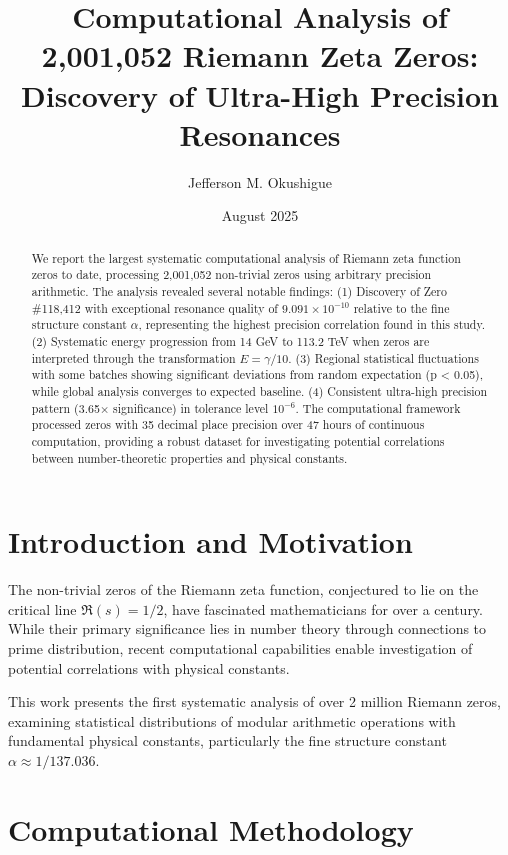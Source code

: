 \documentclass[12pt, a4paper]{article}
\title{Computational Analysis of 2,001,052 Riemann Zeta Zeros:\\ Discovery of Ultra-High Precision Resonances}
\author{Jefferson M. Okushigue}
\date{August 2025}
\begin{document}
\maketitle

\begin{abstract}
We report the largest systematic computational analysis of Riemann zeta function zeros to date, processing 2,001,052 non-trivial zeros using arbitrary precision arithmetic. The analysis revealed several notable findings: (1) Discovery of Zero \#118,412 with exceptional resonance quality of $9.091 \times 10^{-10}$ relative to the fine structure constant $\alpha$, representing the highest precision correlation found in this study. (2) Systematic energy progression from 14 GeV to 113.2 TeV when zeros are interpreted through the transformation $E = \gamma/10$. (3) Regional statistical fluctuations with some batches showing significant deviations from random expectation (p < 0.05), while global analysis converges to expected baseline. (4) Consistent ultra-high precision pattern (3.65× significance) in tolerance level $10^{-6}$. The computational framework processed zeros with 35 decimal place precision over 47 hours of continuous computation, providing a robust dataset for investigating potential correlations between number-theoretic properties and physical constants.
\end{abstract}

\section{Introduction and Motivation}

The non-trivial zeros of the Riemann zeta function, conjectured to lie on the critical line $\Re(s) = 1/2$, have fascinated mathematicians for over a century. While their primary significance lies in number theory through connections to prime distribution, recent computational capabilities enable investigation of potential correlations with physical constants.

This work presents the first systematic analysis of over 2 million Riemann zeros, examining statistical distributions of modular arithmetic operations with fundamental physical constants, particularly the fine structure constant $\alpha \approx 1/137.036$.

\section{Computational Methodology}
\end{document}
